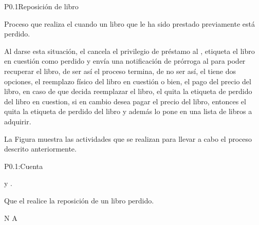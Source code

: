 
\begin{Proceso}{P0.1}{Reposición de libro} {
  

  Proceso que realiza el  cuando un libro que le ha sido prestado previamente está perdido.
  
  Al darse esta situación, el  cancela el privilegio de préstamo al  , etiqueta el libro en cuestión como perdido y envía una notificación de prórroga al  para poder recuperar el libro, de ser así el proceso termina, de no ser así, el  tiene dos opciones, el reemplazo físico del libro en cuestión o bien, el pago del precio del libro, en caso de que decida reemplazar el libro, el  quita la etiqueta de perdido del libro en cuestion, si en cambio desea pagar el precio del libro, entonces el  quita la etiqueta de perdido del libro y además lo pone en una lista de libros a adquirir.



  \noindent La Figura  muestra las actividades que se realizan para llevar a cabo el proceso descrito anteriormente.


} {P0.1:Cuenta}


   { %
     y .
  }

   { %
    Que el  realice la reposición de un libro perdido.
  }

   { %
  	\begin{UClist}
  		\UCli N A
    \end {UClist}
  }
  

\end{Proceso}
